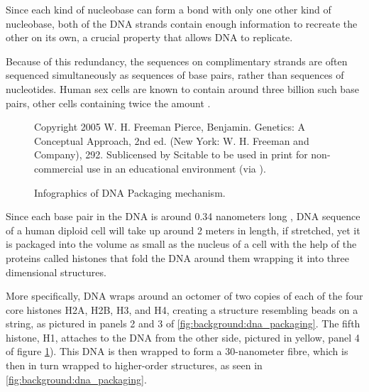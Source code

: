 \documentclass[parskip]{cs4rep}
\begin{document}
Since each kind of nucleobase can form a bond with only one other kind of
nucleobase, both of the DNA strands contain enough information to recreate the
other on its own, a crucial property that allows DNA to replicate. 

Because of this redundancy, the sequences on complimentary strands are often sequenced simultaneously as sequences of base pairs, rather than sequences of nucleotides. Human sex cells are known to contain around three billion such base pairs, other cells containing twice the amount \cite{Annunziato:2008wh}.

\begin{figure}[p]
   \centering
   {Copyright 2005 W. H. Freeman Pierce, Benjamin. Genetics: A Conceptual Approach, 2nd ed. (New York: W. H. Freeman and Company), 292. Sublicensed by Scitable to be used in print for non-commercial use in an educational environment (via \cite{Annunziato:2008wh}).}
   
   \caption{Infographics of DNA Packaging mechanism. }
   \label{fig:background:dna_packaging} 
\end{figure}

Since each base pair in the DNA is around 0.34 nanometers long \cite{Annunziato:2008wh},
DNA sequence of a human diploid cell will take up around 2 meters in length, if stretched, yet it is packaged into the volume as small as the nucleus of a cell with the help of the proteins called histones that fold the DNA around them wrapping it into three dimensional structures.

More specifically, DNA wraps around an octomer of two copies of each of the four core histones H2A, H2B, H3, and H4, creating a structure resembling beads on a string, as pictured in panels 2 and 3 of \autoref{fig:background:dna_packaging}. The fifth histone, H1, attaches to the DNA from the other side, pictured in yellow, panel 4 of figure \ref{fig:background:dna_packaging}). This DNA is then wrapped to form a 30-nanometer fibre, which is then in turn wrapped to higher-order structures, as seen in \autoref{fig:background:dna_packaging}.
\end{document}
